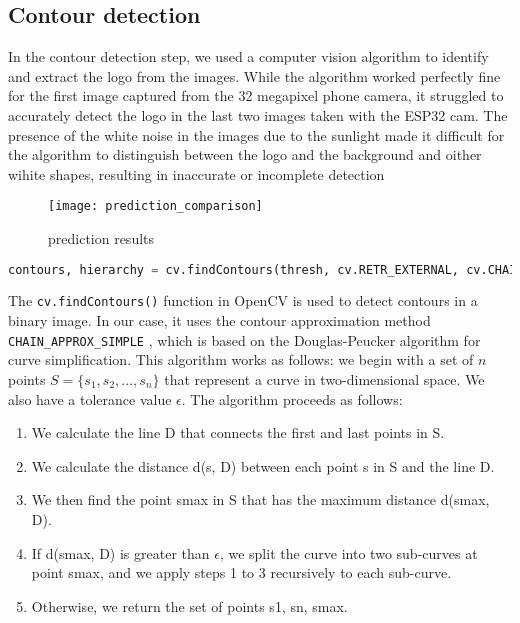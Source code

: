 \subsection{Contour detection}
In the contour detection step, we used a computer vision algorithm to identify and extract the logo from the images. While the algorithm worked perfectly fine for the first image captured from the 32 megapixel phone camera, it struggled to accurately detect the logo in the last two images taken with the ESP32 cam. The presence of the white noise in the images due to the sunlight made it difficult for the algorithm to distinguish between the logo and the background and oither wihite shapes, resulting in inaccurate or incomplete detection
\FloatBarrier
\begin{figure}[h]

         \centering
        \texttt{[image: prediction\_comparison]}
   
        \caption{prediction results}
        \label{fig:prediction results}
\FloatBarrier
    \end{figure}
\FloatBarrier

\FloatBarrier
\begin{lstlisting}[language=Python]
    contours, hierarchy = cv.findContours(thresh, cv.RETR_EXTERNAL, cv.CHAIN_APPROX_SIMPLE)

\end{lstlisting}
\FloatBarrier



The \texttt{cv.findContours()} function in OpenCV is used to detect contours in a binary image. In our case, it uses the contour approximation method \texttt{CHAIN\_APPROX\_SIMPLE} \cite{CD21}, which is based on the Douglas-Peucker algorithm for curve simplification. This algorithm works as follows:
we begin with a set of $n$ points $S = \{s_1, s_2, ..., s_n\}$ that represent a curve in two-dimensional space. We also have a tolerance value $\epsilon$. The algorithm proceeds as follows:

\begin{enumerate}
\item  We calculate the line D that connects the first and last points in S.
\item  We calculate the distance d(s, D) between each point s in S and the line D.
\item We then find the point smax in S that has the maximum distance d(smax, D).
\item If d(smax, D) is greater than $\epsilon$, we split the curve into two sub-curves at point smax, and we apply steps 1 to 3 recursively to each sub-curve.
\item Otherwise, we return the set of points {s1, sn, smax}.
\end{enumerate}

